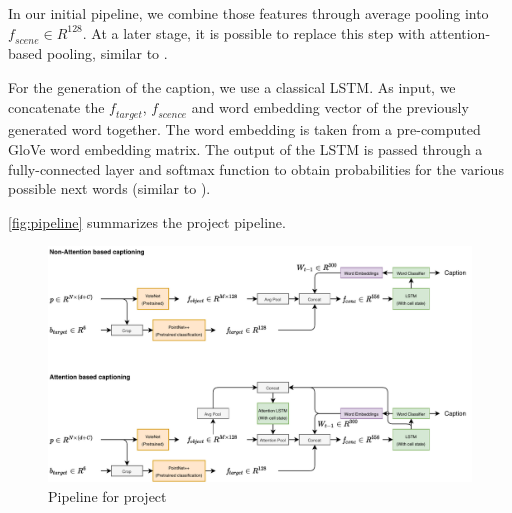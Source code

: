 \documentclass[10pt,twocolumn,letterpaper]{article}
\begin{document}
In our initial pipeline, we combine those features through average pooling into $\mathit{f_{scene}}\in R^{128}$. At a later stage, it is possible to replace this step with attention-based pooling, similar to \cite{anderson2018bottom}.

For the generation of the caption, we use a classical LSTM. As input, we concatenate the $\mathit{f_{target}}$, $\mathit{f_{scence}}$ and word embedding vector of the previously generated word together. The word embedding is taken from a pre-computed GloVe \cite{pennington2014glove} word embedding matrix. The output of the LSTM is passed through a fully-connected layer and softmax function to obtain probabilities for the various possible next words (similar to \cite{xu2015show}).

\autoref{fig:pipeline} summarizes the project pipeline.

\begin{figure}
	\centering
	\includegraphics[width=\textwidth]{figures/pipeline_sketch.pdf}
	\caption{Pipeline for project}
	\label{fig:pipeline}
\end{figure}
\end{document}
